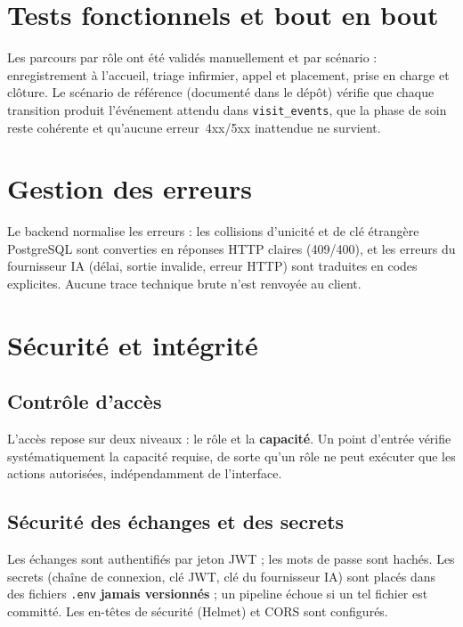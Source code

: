 \section{Tests fonctionnels et bout en bout}

Les parcours par rôle ont été validés manuellement et par scénario : enregistrement à l'accueil, triage infirmier, appel et placement, prise en charge et clôture. Le scénario de référence (documenté dans le dépôt) vérifie que chaque transition produit l'événement attendu dans \texttt{visit\_events}, que la phase de soin reste cohérente et qu'aucune erreur~4xx/5xx inattendue ne survient.

\section{Gestion des erreurs}

Le backend normalise les erreurs : les collisions d'unicité et de clé étrangère PostgreSQL sont converties en réponses HTTP claires (409/400), et les erreurs du fournisseur IA (délai, sortie invalide, erreur HTTP) sont traduites en codes explicites. Aucune trace technique brute n'est renvoyée au client.

\section{Sécurité et intégrité}

\subsection{Contrôle d'accès}

L'accès repose sur deux niveaux : le rôle et la \textbf{capacité}. Un point d'entrée vérifie systématiquement la capacité requise, de sorte qu'un rôle ne peut exécuter que les actions autorisées, indépendamment de l'interface.

\subsection{Sécurité des échanges et des secrets}

Les échanges sont authentifiés par jeton JWT ; les mots de passe sont hachés. Les secrets (chaîne de connexion, clé JWT, clé du fournisseur IA) sont placés dans des fichiers \texttt{.env} \textbf{jamais versionnés} ; un pipeline échoue si un tel fichier est committé. Les en-têtes de sécurité (Helmet) et CORS sont configurés.

